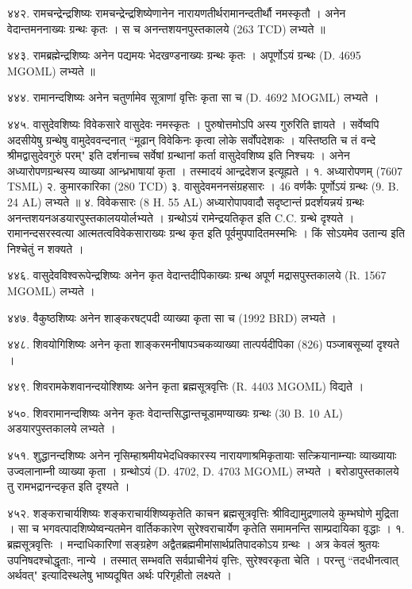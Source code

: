 ४४२. रामचन्द्रेन्द्रशिष्यः
रामचन्द्रेन्द्रशिष्येणानेन नारायणतीर्थरामानन्दतीर्थौ नमस्कृतौ । अनेन वेदान्तमननाख्यः ग्रन्थः कृतः । स च अनन्तशयनपुस्तकालये (263 TCD) लभ्यते ॥

४४३. रामब्रह्मेन्द्रशिष्यः
अनेन पद्यमयः भेदखण्डनाख्यः ग्रन्थः कृतः । अपूर्णोऽयं ग्रन्थः (D. 4695 MGOML) लभ्यते ॥

४४४. रामानन्दशिष्यः
अनेन चतुर्णामेव सूत्राणां वृत्तिः कृता सा च (D. 4692 MOGML) लभ्यते ।

४४५. वासुदेवशिष्यः
विवेकसारे वासुदेवः नमस्कृतः । पुरुषोत्तमोऽपि अस्य गुरुरिति ज्ञायते । सर्वेष्वपि अदसीयेषु ग्रन्थेषु वामुदेववन्दनात् ``मूढान् विवेकिनः कृत्वा लोके सर्वोंपदेशकः । यस्तिष्ठति च तं वन्दे श्रीमद्वासुदेवगुरुं परम्" इति दर्शनाच्च सर्वेषां ग्रन्थानां कर्ता वासुदेवशिष्य इति निश्चयः । अनेन अध्यारोपणग्रन्थस्य व्याख्या आन्ध्रभाषायां कृता । तस्मादयं आन्द्रदेशज इत्यूह्यते ।
१. अध्यारोपणम् (7607 TSML)
२. कुमारकारिका (280 TCD)
३. वासुदेवमननसंग्रहसारः । 46 वर्णकैः पूर्णोऽयं ग्रन्थः (9. B. 24 AL) लभ्यते ॥
४. विवेकसारः (8 H. 55 AL)
अध्यारोपापवादौ सदृष्टान्तं प्रदर्शयन्नयं ग्रन्थः अनन्तशयनअडयारपुस्तकालययोर्लभ्यते । ग्रन्थोऽयं रामेन्द्रयतिकृत इति C.C. ग्रन्थे दृश्यते । रामानन्दसरस्वत्या आत्मतत्वविवेकसाराख्यः ग्रन्थ कृत इति पूर्वमुपपादितमस्मभिः । किं सोऽयमेव उतान्य इति निश्चेतुं न शक्यते ।

४४६. वासुदेवविश्वरूपेन्द्रशिष्यः
अनेन कृत वेदान्तदीपिकाख्यः ग्रन्थ अपूर्ण मद्रासपुस्तकालये (R. 1567 MGOML) लभ्यते ।

४४७. वैकुष्ठशिष्यः
अनेन शाङ्करषट्पदी व्याख्या कृता सा च (1992 BRD) लभ्यते ।

४४८. शिवयोगिशिष्यः
अनेन कृता शाङ्करमनीषापञ्चकव्याख्या तात्पर्यदीपिका (826) पञ्जाबसूच्यां दृश्यते ।

४४९. शिवरामकेशवानन्दयोश्शिष्यः
अनेन कृता ब्रह्मसूत्रवृत्तिः (R. 4403 MGOML) विद्यते ।

४५०. शिवरामानन्दशिष्यः
अनेन कृतः वेदान्तसिद्धान्तचूडामण्याख्यः ग्रन्थः (30 B. 10 AL) अडयारपुस्तकालये लभ्यते ।

४५१. शुद्धानन्दशिष्यः 
अनेन नृसिम्हाश्रमीयभेदधिक्कारस्य नारायणाश्रमिकृतायाः सत्क्रियानाम्न्याः व्याख्यायाः उज्वलानाम्नी व्याख्या कृता । ग्रन्थोऽयं (D. 4702, D. 4703 MGOML) लभ्यते । बरोडापुस्तकालये तु रामभद्रानन्दकृत इति दृश्यते ।

४५२. शङ्कराचार्यशिष्यः
शङ्कराचार्यशिष्यकृतेति काचन ब्रह्मसूत्रवृत्तिः श्रीविद्यामुद्रणालये कुम्भघोणे मुद्रिता । सा च भगवत्पादशिष्येष्वन्यतमेन वार्तिककारेण सुरेश्वराचार्येण कृतेति समामनन्ति साम्प्रदायिका वृद्धाः ।
१. ब्रह्मसूत्रवृत्तिः । मन्दाधिकारिणां सङ्ग्रहेण अद्वैतब्रह्ममीमांसार्थप्रतिपादकोऽय ग्रन्थः । अत्र केवलं श्रुतयः उपनिषदश्चोद्धृताः, नान्ये । तस्मात् सम्भवति सर्वप्राचीनेयं वृत्तिः, सुरेश्वरकृता चेति । परन्तु ``तदधीनत्वात् अर्थवत्" इत्यादिस्थलेषु भाष्यदूषित अर्थः परिगृहीतो लक्ष्यते ।

